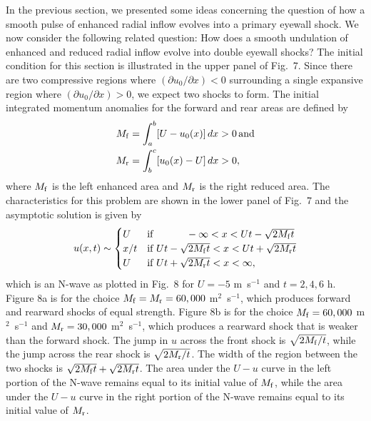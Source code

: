 \documentclass[10pt]{article}
\begin{document}
     In the previous section, we presented some ideas concerning the
question of how a smooth pulse of enhanced radial inflow evolves into
a primary eyewall shock. We now consider the following related question:
How does a smooth undulation of enhanced and reduced radial inflow
evolve into double eyewall shocks? The initial condition for this section is illustrated
in the upper panel of Fig.~7. Since there are two compressive regions where
$(\partial u_0/\partial x)<0$ surrounding a single expansive region where
$(\partial u_0/\partial x)>0$, we expect two shocks to form. The initial
integrated momentum anomalies for the forward and rear areas are defined by
\begin{equation}                                 %
  \begin{split}
      M_{\rm f} &= \int_a^b [U - u_0(x)]\, dx > 0\,\text{and} \\
      M_{\rm r} &= \int_b^c [u_0(x) - U]\, dx > 0,
  \end{split}
\label{eq3.1}
\end{equation}
where $M_{\rm f}$ is the left enhanced area and $M_{\rm r}$ is
the right reduced area.
The characteristics for this problem are shown in the lower panel of
Fig.~7 and the asymptotic solution is given by
\begin{equation}                                 %
   u(x,t) \sim \begin{cases}
                 U    & \text{if } \qquad\quad     -\infty < x < Ut-\sqrt{2M_{\rm f}t} \\
                 x/t  & \text{if }   Ut-\sqrt{2M_{\rm f}t} < x < Ut+\sqrt{2M_{\rm r}t} \\
	         U    & \text{if }   Ut+\sqrt{2M_{\rm r}t} < x < \infty,
               \end{cases}
\label{eq3.2}
\end{equation}
which is an N-wave as plotted in Fig.~8 for $U=-5$ m\, s$^{-1}$ and $t=2,4,6$ h.
Figure 8a is for the choice $M_{\rm f}=M_{\rm r}=60,000$ m$^2$~s$^{-1}$,
which produces forward and rearward shocks of equal strength. Figure 8b is
for the choice $M_{\rm f}=60,000$ m$^2$~s$^{-1}$ and $M_{\rm r}=30,000$ m$^2$~s$^{-1}$,
which produces a rearward shock that is weaker than the forward shock.
The jump in $u$ across the front shock is $\sqrt{2M_{\rm f}/t}$, while the jump
across the rear shock is $\sqrt{2M_{\rm r}/t}$. The width of the region between
the two shocks is $\sqrt{2M_{\rm f}t}+\sqrt{2M_{\rm r}t}$. The area under the $U-u$
curve in the left portion of the N-wave remains equal to its initial value
of $M_{\rm f}$, while the area under the $U-u$ curve in the right portion of the
N-wave remains equal to its initial value of $M_{\rm r}$.
\end{document}
